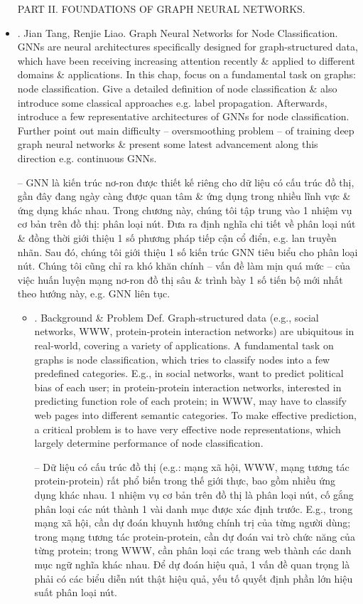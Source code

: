 \documentclass{article}
\begin{document}
\begin{itemize}
    PART II. FOUNDATIONS OF GRAPH NEURAL NETWORKS.
    \item {. {\sc Jian Tang, Renjie Liao}. Graph Neural Networks for Node Classification.} GNNs are neural architectures specifically designed for graph-structured data, which have been receiving increasing attention recently \& applied to different domains \& applications. In this chap, focus on a fundamental task on graphs: node classification. Give a detailed definition of node classification \& also introduce some classical approaches e.g. label propagation. Afterwards, introduce a few representative architectures of GNNs for node classification. Further point out main difficulty -- oversmoothing problem -- of training deep graph neural networks \& present some latest advancement along this direction e.g. continuous GNNs.

    -- GNN là kiến trúc nơ-ron được thiết kế riêng cho dữ liệu có cấu trúc đồ thị, gần đây đang ngày càng được quan tâm \& ứng dụng trong nhiều lĩnh vực \& ứng dụng khác nhau. Trong chương này, chúng tôi tập trung vào 1 nhiệm vụ cơ bản trên đồ thị: phân loại nút. Đưa ra định nghĩa chi tiết về phân loại nút \& đồng thời giới thiệu 1 số phương pháp tiếp cận cổ điển, e.g. lan truyền nhãn. Sau đó, chúng tôi giới thiệu 1 số kiến trúc GNN tiêu biểu cho phân loại nút. Chúng tôi cũng chỉ ra khó khăn chính -- vấn đề làm mịn quá mức -- của việc huấn luyện mạng nơ-ron đồ thị sâu \& trình bày 1 số tiến bộ mới nhất theo hướng này, e.g. GNN liên tục.
    \begin{itemize}
        \item {. Background \& Problem Def.} Graph-structured data (e.g., social networks, WWW, protein-protein interaction networks) are ubiquitous in real-world, covering a variety of applications. A fundamental task on graphs is node classification, which tries to classify nodes into a few predefined categories. E.g., in social networks, want to predict political bias of each user; in protein-protein interaction networks, interested in predicting function role of each protein; in WWW, may have to classify web pages into different semantic categories. To make effective prediction, a critical problem is to have very effective node representations, which largely determine performance of node classification.

        -- Dữ liệu có cấu trúc đồ thị (e.g.: mạng xã hội, WWW, mạng tương tác protein-protein) rất phổ biến trong thế giới thực, bao gồm nhiều ứng dụng khác nhau. 1 nhiệm vụ cơ bản trên đồ thị là phân loại nút, cố gắng phân loại các nút thành 1 vài danh mục được xác định trước. E.g., trong mạng xã hội, cần dự đoán khuynh hướng chính trị của từng người dùng; trong mạng tương tác protein-protein, cần dự đoán vai trò chức năng của từng protein; trong WWW, cần phân loại các trang web thành các danh mục ngữ nghĩa khác nhau. Để dự đoán hiệu quả, 1 vấn đề quan trọng là phải có các biểu diễn nút thật hiệu quả, yếu tố quyết định phần lớn hiệu suất phân loại nút.


\end{itemize}
\end{itemize}
\end{document}
